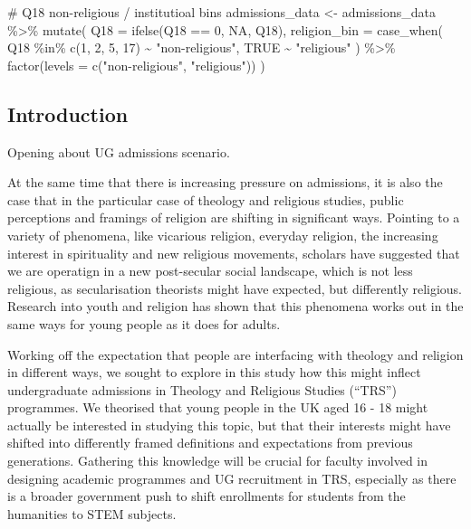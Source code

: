 \documentclass[
  letterpaper,
  DIV=11,
  numbers=noendperiod]{scrartcl}
\newenvironment{Shaded}{\begin{snugshade}}{\end{snugshade}}
\newcommand{\AttributeTok}[1]{\textcolor[rgb]{0.40,0.45,0.13}{#1}}
\newcommand{\CommentTok}[1]{\textcolor[rgb]{0.37,0.37,0.37}{#1}}
\newcommand{\ConstantTok}[1]{\textcolor[rgb]{0.56,0.35,0.01}{#1}}
\newcommand{\DecValTok}[1]{\textcolor[rgb]{0.68,0.00,0.00}{#1}}
\newcommand{\FunctionTok}[1]{\textcolor[rgb]{0.28,0.35,0.67}{#1}}
\newcommand{\NormalTok}[1]{\textcolor[rgb]{0.00,0.23,0.31}{#1}}
\newcommand{\OtherTok}[1]{\textcolor[rgb]{0.00,0.23,0.31}{#1}}
\newcommand{\SpecialCharTok}[1]{\textcolor[rgb]{0.37,0.37,0.37}{#1}}
\newcommand{\StringTok}[1]{\textcolor[rgb]{0.13,0.47,0.30}{#1}}
\begin{document}
\begin{Shaded}
\begin{Highlighting}[]
\CommentTok{\# Q18 non{-}religious / institutioal bins}
\NormalTok{admissions\_data }\OtherTok{\textless{}{-}}\NormalTok{ admissions\_data }\SpecialCharTok{\%\textgreater{}\%}
  \FunctionTok{mutate}\NormalTok{(}
      \AttributeTok{Q18 =} \FunctionTok{ifelse}\NormalTok{(Q18 }\SpecialCharTok{==} \DecValTok{0}\NormalTok{, }\ConstantTok{NA}\NormalTok{, Q18),}
      \AttributeTok{religion\_bin =} \FunctionTok{case\_when}\NormalTok{(}
\NormalTok{      Q18 }\SpecialCharTok{\%in\%} \FunctionTok{c}\NormalTok{(}\DecValTok{1}\NormalTok{, }\DecValTok{2}\NormalTok{, }\DecValTok{5}\NormalTok{, }\DecValTok{17}\NormalTok{) }\SpecialCharTok{\textasciitilde{}} \StringTok{"non{-}religious"}\NormalTok{,}
      \ConstantTok{TRUE} \SpecialCharTok{\textasciitilde{}} \StringTok{"religious"}
\NormalTok{    ) }\SpecialCharTok{\%\textgreater{}\%} \FunctionTok{factor}\NormalTok{(}\AttributeTok{levels =} \FunctionTok{c}\NormalTok{(}\StringTok{"non{-}religious"}\NormalTok{, }\StringTok{"religious"}\NormalTok{))}
\NormalTok{  )}
\end{Highlighting}
\end{Shaded}

\hypertarget{introduction}{%
\subsection{Introduction}\label{introduction}}

Opening about UG admissions scenario.

At the same time that there is increasing pressure on admissions, it is
also the case that in the particular case of theology and religious
studies, public perceptions and framings of religion are shifting in
significant ways. Pointing to a variety of phenomena, like vicarious
religion, everyday religion, the increasing interest in spirituality and
new religious movements, scholars have suggested that we are operatign
in a new post-secular social landscape, which is not less religious, as
secularisation theorists might have expected, but differently religious.
Research into youth and religion has shown that this phenomena works out
in the same ways for young people as it does for adults.

Working off the expectation that people are interfacing with theology
and religion in different ways, we sought to explore in this study how
this might inflect undergraduate admissions in Theology and Religious
Studies (``TRS'') programmes. We theorised that young people in the UK
aged 16 - 18 might actually be interested in studying this topic, but
that their interests might have shifted into differently framed
definitions and expectations from previous generations. Gathering this
knowledge will be crucial for faculty involved in designing academic
programmes and UG recruitment in TRS, especially as there is a broader
government push to shift enrollments for students from the humanities to
STEM subjects.
\end{document}
